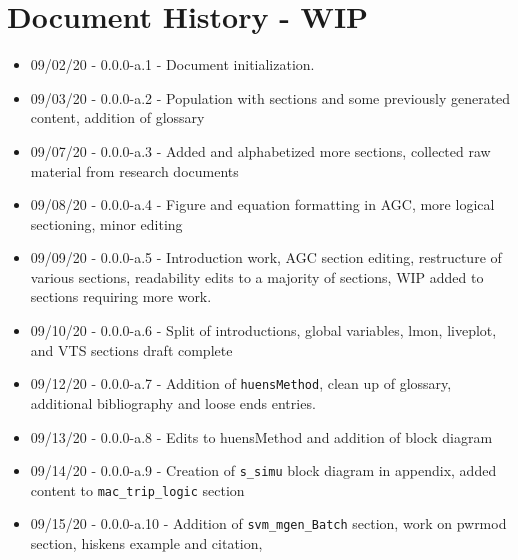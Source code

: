 \chapter{Document History  - WIP}

\begin{itemize}
\itemsep 0em
\item 09/02/20 - 0.0.0-a.1 - Document initialization.
\item 09/03/20 - 0.0.0-a.2 - Population with sections and some previously generated content, addition of glossary
\item 09/07/20 - 0.0.0-a.3 - Added and alphabetized more sections, collected raw material from research documents
\item 09/08/20 - 0.0.0-a.4 - Figure and equation formatting in AGC, more logical sectioning, minor editing
\item 09/09/20 - 0.0.0-a.5 - Introduction work, AGC section editing, restructure of various sections, readability edits to a majority of sections, WIP added to sections requiring more work.
\item 09/10/20 - 0.0.0-a.6 - Split of introductions, global variables, lmon, liveplot, and VTS sections draft complete
\item 09/12/20 - 0.0.0-a.7 - Addition of \verb|huensMethod|, clean up of glossary, additional bibliography and loose ends entries.
\item 09/13/20 - 0.0.0-a.8 - Edits to huensMethod and addition of block diagram 
\item 09/14/20 - 0.0.0-a.9 - Creation of \verb|s_simu| block diagram in appendix, added content to \verb|mac_trip_logic| section
\item 09/15/20 - 0.0.0-a.10 - Addition of \verb|svm_mgen_Batch| section, work on pwrmod section, hiskens example and citation, 
\end{itemize}